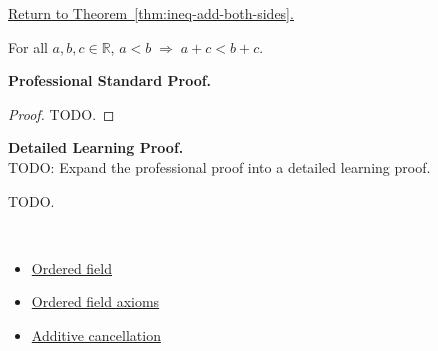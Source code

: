\newpage
{}
\label{prf:ineq-add-both-sides}

\begin{remark*}[Return]
\hyperref[thm:ineq-add-both-sides]{Return to Theorem~\ref*{thm:ineq-add-both-sides}.}
\end{remark*}

\begin{theorem*}
For all $a, b, c \in \mathbb{R}$,
$a < b \;\Rightarrow\; a + c < b + c$.
\end{theorem*}

\textbf{Professional Standard Proof.}~\\
\begin{proof}
TODO.
\end{proof}

\textbf{Detailed Learning Proof.}~\\
TODO: Expand the professional proof into a detailed learning proof.


\begin{remark*}
TODO.
\end{remark*}

\begin{remark*}[Dependencies]~\\
\begin{itemize}
  \item \hyperref[def:ordered-field]{Ordered field}
  \item \hyperref[thm:q-is-ordered-field]{Ordered field axioms}
  \item \hyperref[thm:additive-cancellation]{Additive cancellation}
\end{itemize}
\end{remark*}
